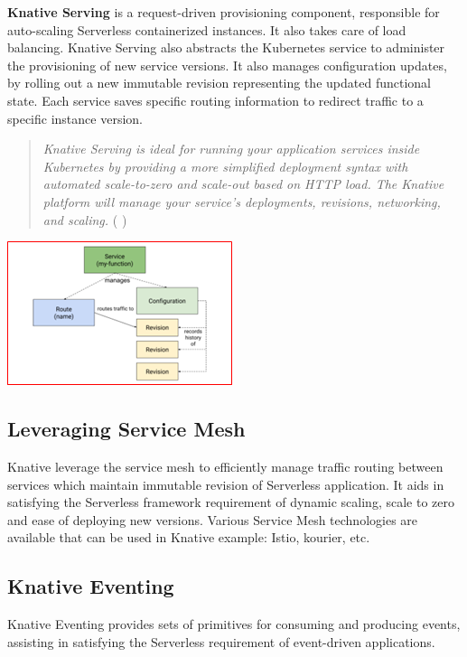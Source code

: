 \documentclass{article}
\begin{document}
\begin{flushleft}
\textbf{Knative Serving} is a request-driven provisioning component, responsible for auto-scaling Serverless containerized instances. It also takes care of load balancing. 
Knative Serving also abstracts the Kubernetes service to administer the provisioning of new service versions. It also manages configuration updates, by rolling out a new immutable revision representing the updated functional state. Each service saves specific routing information to redirect traffic to a specific instance version.
\begin{quote}
   \textit{Knative Serving is ideal for running your application services inside Kubernetes by providing a more simplified deployment syntax with automated scale-to-zero and scale-out based on HTTP load. The Knative platform will manage your service’s deployments, revisions, networking, and scaling.} ( \cite{Sutter_Sampath_2020} )
\end{quote}
\par
\includegraphics[]{images/knative-serving.png}

\subsection{Leveraging Service Mesh}
Knative leverage the service mesh to efficiently manage traffic routing between services which maintain immutable revision of Serverless application. It aids in satisfying the Serverless framework requirement of dynamic scaling, scale to zero and ease of deploying new versions. Various Service Mesh technologies are available that can be used in Knative example: Istio, kourier, etc.

\subsection{Knative Eventing}
Knative Eventing provides sets of primitives for consuming and producing events, assisting in satisfying the Serverless requirement of event-driven applications. 


\end{flushleft}
\end{document}
